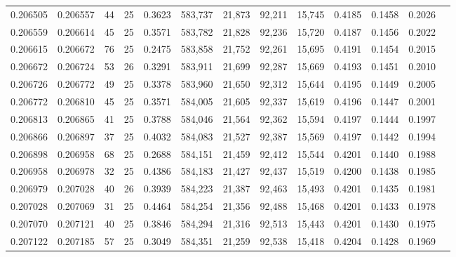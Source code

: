 \begin{tabular}{rrrrrrrrrrrrr}
0.206505 & 0.206557 &  44 &  25 &                                     0.3623 & 583,737 &  21,873 &  92,211 &  15,745 & 0.4185 & 0.1458 & 0.2026 \\
0.206559 & 0.206614 &  45 &  25 &                                     0.3571 & 583,782 &  21,828 &  92,236 &  15,720 & 0.4187 & 0.1456 & 0.2022 \\
0.206615 & 0.206672 &  76 &  25 &                                     0.2475 & 583,858 &  21,752 &  92,261 &  15,695 & 0.4191 & 0.1454 & 0.2015 \\
0.206672 & 0.206724 &  53 &  26 &                                     0.3291 & 583,911 &  21,699 &  92,287 &  15,669 & 0.4193 & 0.1451 & 0.2010 \\
0.206726 & 0.206772 &  49 &  25 &                                     0.3378 & 583,960 &  21,650 &  92,312 &  15,644 & 0.4195 & 0.1449 & 0.2005 \\
0.206772 & 0.206810 &  45 &  25 &                                     0.3571 & 584,005 &  21,605 &  92,337 &  15,619 & 0.4196 & 0.1447 & 0.2001 \\
0.206813 & 0.206865 &  41 &  25 &                                     0.3788 & 584,046 &  21,564 &  92,362 &  15,594 & 0.4197 & 0.1444 & 0.1997 \\
0.206866 & 0.206897 &  37 &  25 &                                     0.4032 & 584,083 &  21,527 &  92,387 &  15,569 & 0.4197 & 0.1442 & 0.1994 \\
0.206898 & 0.206958 &  68 &  25 &                                     0.2688 & 584,151 &  21,459 &  92,412 &  15,544 & 0.4201 & 0.1440 & 0.1988 \\
0.206958 & 0.206978 &  32 &  25 &                                     0.4386 & 584,183 &  21,427 &  92,437 &  15,519 & 0.4200 & 0.1438 & 0.1985 \\
0.206979 & 0.207028 &  40 &  26 &                                     0.3939 & 584,223 &  21,387 &  92,463 &  15,493 & 0.4201 & 0.1435 & 0.1981 \\
0.207028 & 0.207069 &  31 &  25 &                                     0.4464 & 584,254 &  21,356 &  92,488 &  15,468 & 0.4201 & 0.1433 & 0.1978 \\
0.207070 & 0.207121 &  40 &  25 &                                     0.3846 & 584,294 &  21,316 &  92,513 &  15,443 & 0.4201 & 0.1430 & 0.1975 \\
0.207122 & 0.207185 &  57 &  25 &                                     0.3049 & 584,351 &  21,259 &  92,538 &  15,418 & 0.4204 & 0.1428 & 0.1969 \\

\end{tabular}
